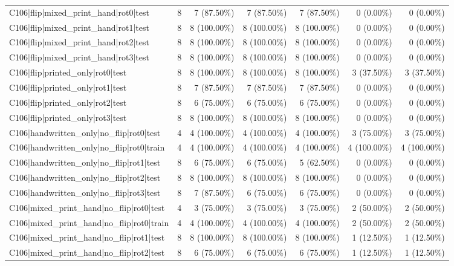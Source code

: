 \begin{longtable}{>{\raggedright\arraybackslash}p{5cm}rrrrrr}
C106|flip|mixed\_print\_hand|rot0|test & 8 & 7 (87.50\%) & 7 (87.50\%) & 7 (87.50\%) & 0 (0.00\%) & 0 (0.00\%) \\
C106|flip|mixed\_print\_hand|rot1|test & 8 & 8 (100.00\%) & 8 (100.00\%) & 8 (100.00\%) & 0 (0.00\%) & 0 (0.00\%) \\
C106|flip|mixed\_print\_hand|rot2|test & 8 & 8 (100.00\%) & 8 (100.00\%) & 8 (100.00\%) & 0 (0.00\%) & 0 (0.00\%) \\
C106|flip|mixed\_print\_hand|rot3|test & 8 & 8 (100.00\%) & 8 (100.00\%) & 8 (100.00\%) & 0 (0.00\%) & 0 (0.00\%) \\
C106|flip|printed\_only|rot0|test & 8 & 8 (100.00\%) & 8 (100.00\%) & 8 (100.00\%) & 3 (37.50\%) & 3 (37.50\%) \\
C106|flip|printed\_only|rot1|test & 8 & 7 (87.50\%) & 7 (87.50\%) & 7 (87.50\%) & 0 (0.00\%) & 0 (0.00\%) \\
C106|flip|printed\_only|rot2|test & 8 & 6 (75.00\%) & 6 (75.00\%) & 6 (75.00\%) & 0 (0.00\%) & 0 (0.00\%) \\
C106|flip|printed\_only|rot3|test & 8 & 8 (100.00\%) & 8 (100.00\%) & 8 (100.00\%) & 0 (0.00\%) & 0 (0.00\%) \\
C106|handwritten\_only|no\_flip|rot0|test & 4 & 4 (100.00\%) & 4 (100.00\%) & 4 (100.00\%) & 3 (75.00\%) & 3 (75.00\%) \\
C106|handwritten\_only|no\_flip|rot0|train & 4 & 4 (100.00\%) & 4 (100.00\%) & 4 (100.00\%) & 4 (100.00\%) & 4 (100.00\%) \\
C106|handwritten\_only|no\_flip|rot1|test & 8 & 6 (75.00\%) & 6 (75.00\%) & 5 (62.50\%) & 0 (0.00\%) & 0 (0.00\%) \\
C106|handwritten\_only|no\_flip|rot2|test & 8 & 8 (100.00\%) & 8 (100.00\%) & 8 (100.00\%) & 0 (0.00\%) & 0 (0.00\%) \\
C106|handwritten\_only|no\_flip|rot3|test & 8 & 7 (87.50\%) & 6 (75.00\%) & 6 (75.00\%) & 0 (0.00\%) & 0 (0.00\%) \\
C106|mixed\_print\_hand|no\_flip|rot0|test & 4 & 3 (75.00\%) & 3 (75.00\%) & 3 (75.00\%) & 2 (50.00\%) & 2 (50.00\%) \\
C106|mixed\_print\_hand|no\_flip|rot0|train & 4 & 4 (100.00\%) & 4 (100.00\%) & 4 (100.00\%) & 2 (50.00\%) & 2 (50.00\%) \\
C106|mixed\_print\_hand|no\_flip|rot1|test & 8 & 8 (100.00\%) & 8 (100.00\%) & 8 (100.00\%) & 1 (12.50\%) & 1 (12.50\%) \\
C106|mixed\_print\_hand|no\_flip|rot2|test & 8 & 6 (75.00\%) & 6 (75.00\%) & 6 (75.00\%) & 1 (12.50\%) & 1 (12.50\%) \\

\end{longtable}
